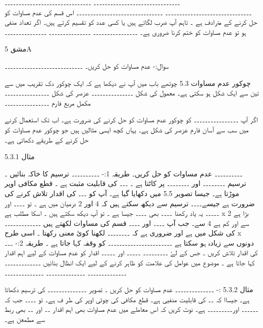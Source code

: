 ۔۔۔۔۔۔۔۔۔۔۔۔۔۔۔۔۔۔۔۔۔۔۔۔۔۔۔۔۔۔۔
۔۔۔۔۔۔۔۔۔۔۔۔۔۔۔۔۔۔۔۔۔۔۔۔۔۔۔۔۔۔۔
۔۔۔۔۔۔۔۔۔۔۔۔۔۔۔۔۔۔۔۔۔۔۔۔۔۔۔۔۔۔۔
۔۔۔۔۔۔۔۔۔۔۔۔۔۔۔۔۔۔۔۔۔۔۔۔۔۔۔۔۔۔۔
اس قسم کی عدم مساوات کو حل کرنے کے مترادف ہے ۔ تاہم آپ ضرب لگاتے ہیں یا کسی عدد کو تقسیم کرتے ہیں۔ اگر تعداد منفی ہو تو عدم مساوات کو ختم کرنا ضروری ہے۔ 
۔۔۔۔۔۔۔۔۔۔۔۔۔۔۔۔
۔۔۔۔۔۔۔۔۔۔۔۔۔۔۔
۔۔۔۔۔۔۔۔۔۔۔۔۔۔۔ 

مشق 5A

سوال:- عدم مساوات کو حل کریں۔
۔۔۔۔۔۔۔۔۔۔۔۔۔۔۔۔۔۔۔۔۔۔۔۔۔۔۔۔

چوکور عدم مساوات 5.3
چوتھے باب میں آپ نے دیکھا ہے کہ ایک چوکور دک تقریب میں سے تین سے ایک شکل ہو سکتی ہے۔
معمول کی شکل ۔۔۔۔۔۔۔۔۔۔۔۔۔۔۔
عزصر کی شکل ۔۔۔۔۔۔۔۔۔۔۔۔۔۔۔۔
مکمل مربع فارم ۔۔۔۔۔۔۔۔۔۔۔۔۔۔۔۔

اگر آپ ۔۔۔۔۔۔۔۔۔۔۔۔۔۔۔۔ کو چوکور عدم مساوات کو حل کرنے کی ضرورت ہے۔ اب تک استعمال کرنے میں سب سے آسان فارم عزصر کی شکل ہے۔
یہاں کچھ ایسی مثالیں ہیں جو چوکور عدم مساوات کو حل کرنے کے طریقے دکھاتی ہے۔



مثال 5.3.1

۔۔۔۔۔۔۔۔۔۔ عدم مساوات کو حل کریں۔
طریقہ 1:-
۔۔۔۔۔۔۔۔۔۔ ترسیم کا خاکہ بنائیں ۔
ترسیم ۔۔۔۔۔۔۔۔ اور ۔۔۔۔۔۔۔۔ پر کاٹتا ہے ۔
۔۔۔ کی قابلیت مثبت ہے ۔ قطع مکافی اوپر موڑتا ہے۔ جیسا تصویر 5.5 میں دکھایا گیا ہے۔
آپ کو ۔۔۔ کی اقدار تلاش کرنے کی ضرورت ہے جیسے۔۔۔۔ ترسیم سے دیکھ سکتے ہیں کہ 4 اور 2 درمیان میں ہے ۔ تو ۔۔۔۔ اور ۔۔۔۔۔ یہ یاد رکھنا ۔۔۔۔ بھی ۔۔۔۔ جیسا ہے ۔ تو آپ دیکھ سکتے ہیں ۔ اسکا مطلب ہے x بڑا ہے 2 سے اور کم ہے 4 سے۔ جب آپ ۔۔۔۔ اور ۔۔۔۔ قسم کی مساوات لکھتے ہیں ۔۔۔۔۔۔۔۔۔۔۔۔۔ کی شکل میں ہے اور ضروری ہے کہ ۔۔۔۔۔۔۔۔ لکھنا کوئ معنی رکھتا ۔ اسی طرح x دونوں سے زیادہ ہو سکتا ہے ۔۔۔۔۔۔۔۔۔۔۔۔۔۔۔۔۔۔۔۔۔۔۔ کو وقفہ کہا جاتا ہے ۔
طریقہ 2:-
۔۔۔ کی اقدار تلاش کریں ۔ جس کے لۓ ۔۔۔۔۔۔۔۔۔
۔۔۔۔۔ اور ۔۔۔۔۔ اقدار کو عدم مساوات کے لیے اہم اقدار کہا جاتا ہے ۔
موضوع میں عوامل کی علامت کو ظاہر کرنے کے لیے ایک انظال بنائیں ۔۔۔۔۔۔۔۔۔۔۔۔۔
۔۔۔۔۔۔۔۔۔۔۔۔۔۔
۔۔۔۔۔۔۔۔۔۔۔۔۔۔
۔۔۔۔۔۔۔۔۔۔۔۔۔۔

مثال 5.3.2 :-
۔۔۔۔۔۔۔۔۔۔۔۔۔۔ عدم مساوات کو حل کریں ۔
تصویر ۔۔۔۔۔۔۔۔۔۔۔۔۔۔ کی ترسیم دکھاتا ہے۔ جیساا کہ ۔۔ کی قابلیت منفیی ہے۔ قطع مکافی کی چوٹی اوپر کی طر                   ف ہے۔ تو ۔۔۔۔ جب   کہ ۔۔۔۔۔۔ اور۔۔۔۔۔۔۔۔۔ ہے۔ نوٹ کریں کہ اس معاملے میں عدم مساوات بھی اہم اقدار ۔۔ اور ۔۔ بھی ربط سے مطمعن ہے۔ 

